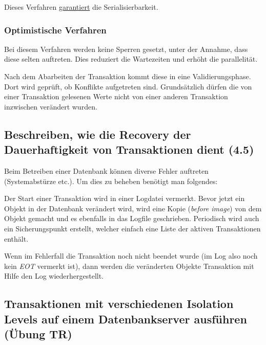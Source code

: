 Dieses Verfahren \underline{garantiert} die Serialisierbarkeit.


\subsubsection{Optimistische Verfahren}
Bei diesem Verfahren werden keine Sperren gesetzt, unter der Annahme, dass diese selten auftreten. Dies reduziert die Wartezeiten und erhöht die parallelität.

Nach dem Abarbeiten der Transaktion kommt diese in eine Validierungsphase. Dort wird geprüft, ob Konflikte aufgetreten sind. Grundsätzlich dürfen die von einer Transaktion gelesenen Werte nicht von einer anderen Transaktion inzwischen verändert wurden.

\subsection{Beschreiben, wie die Recovery der Dauerhaftigkeit von Transaktionen dient (4.5)}

Beim Betreiben einer Datenbank können diverse Fehler auftreten (Systemabstürze etc.). Um dies zu beheben benötigt man folgendes:

Der Start einer Transaktion wird in einer Logdatei vermerkt. Bevor jetzt ein Objekt in der Datenbank verändert wird, wird eine Kopie (\emph{before image}) von dem Objekt gemacht und es ebenfalls in das Logfile geschrieben. Periodisch wird auch ein Sicherungspunkt erstellt, welcher einfach eine Liste der aktiven Transaktionen enthält.

Wenn im Fehlerfall die Transaktion noch nicht beendet wurde (im Log also noch kein \emph{EOT} vermerkt ist), dann werden die veränderten Objekte Transaktion mit Hilfe den Log wiederhergestellt.

\subsection{Transaktionen mit verschiedenen Isolation Levels auf einem Datenbankserver ausführen (Übung TR)}

